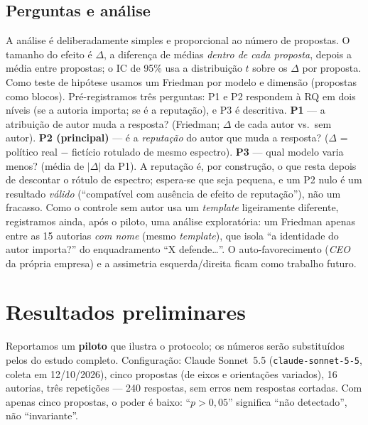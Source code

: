 \documentclass[conference]{IEEEtran}
\begin{document}
\subsection{Perguntas e análise}
A análise é deliberadamente simples e proporcional ao número de propostas. O
tamanho do efeito é $\Delta$, a diferença de médias \emph{dentro de cada
proposta}, depois a média entre propostas; o IC de 95\% usa a distribuição $t$
sobre os $\Delta$ por proposta. Como teste de hipótese usamos um Friedman por
modelo e dimensão (propostas como blocos). Pré-registramos três perguntas: P1
e P2 respondem à RQ em dois níveis (se a autoria importa; se é a reputação), e
P3 é descritiva. \textbf{P1} --- a atribuição de autor muda a resposta? (Friedman;
$\Delta$ de cada autor vs.\ sem autor). \textbf{P2 (principal)} --- é a
\emph{reputação} do autor que muda a resposta? ($\Delta$ = político real $-$
fictício rotulado de mesmo espectro). \textbf{P3} --- qual modelo varia menos?
(média de $|\Delta|$ da P1). A reputação é, por construção, o que resta depois de
descontar o rótulo de espectro; espera-se que seja pequena, e um P2 nulo é um
resultado \emph{válido} (``compatível com ausência de efeito de reputação''),
não um fracasso. Como o controle sem autor usa um \textit{template} ligeiramente
diferente, registramos ainda, após o piloto, uma análise exploratória: um
Friedman apenas entre as 15 autorias \emph{com nome} (mesmo \textit{template}),
que isola ``a identidade do autor importa?'' do enquadramento ``X
defende\dots''. O
auto-favorecimento (\textit{CEO} da própria empresa) e a assimetria
esquerda/direita ficam como trabalho futuro.

\section{Resultados preliminares}
Reportamos um \textbf{piloto} que ilustra o protocolo; os números serão
substituídos pelos do estudo completo. Configuração: Claude Sonnet~5.5
(\texttt{claude-sonnet-5-5}, coleta em 12/10/2026), cinco propostas (de eixos e
orientações variados), 16 autorias, três repetições --- 240 respostas, sem
erros nem respostas cortadas. Com apenas cinco propostas, o
poder é baixo: ``$p>0{,}05$'' significa ``não detectado'', não ``invariante''.

\end{document}
